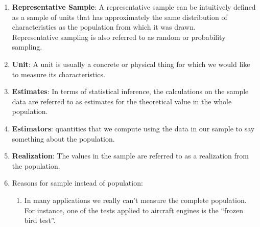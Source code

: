 \begin{enumerate}
    \item \textbf{Representative Sample}\label{Sampling Plans/Representative Sample}:  A representative sample can be intuitively defined as a sample of units that has approximately the same distribution of characteristics as the population from which it was drawn.
    \hfill \cite{statistics/book/Statistics-for-Data-Scientists/Maurits-Kaptein}
    \\
    Representative sampling is also referred to as random or probability sampling.
    \hfill \cite{statistics/book/Statistics-for-Data-Scientists/Maurits-Kaptein}

    \item \textbf{Unit}\label{Sampling Plans/Unit}: A unit is usually a concrete or physical thing for which we would like to measure its characteristics.
    \hfill \cite{statistics/book/Statistics-for-Data-Scientists/Maurits-Kaptein}

    \item \textbf{Estimates}\label{Sampling Plans/Estimates}: In terms of statistical inference, the calculations on the sample data are referred to as estimates for the theoretical value in the whole population.
    \hfill \cite{statistics/book/Statistics-for-Data-Scientists/Maurits-Kaptein}

    \item \textbf{Estimators}\label{Sampling Plans/Estimators}: quantities that we compute using the data in our sample to say something about the population.
    \hfill \cite{statistics/book/Statistics-for-Data-Scientists/Maurits-Kaptein}

    \item \textbf{Realization}\label{Sampling Plans/realization}: The values in the sample are referred to as a realization from the population.
    \hfill \cite{statistics/book/Statistics-for-Data-Scientists/Maurits-Kaptein}

    \vspace{0.5cm}

    \item Reasons for sample instead of population:
    \begin{enumerate}
        \item In many applications we really can’t measure the complete population. For instance, one of the tests applied to aircraft engines is the “frozen bird test”. 
        \hfill \cite{statistics/book/Statistics-for-Data-Scientists/Maurits-Kaptein}


\end{enumerate}
\end{enumerate}
